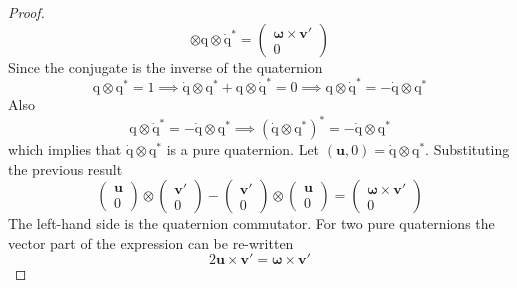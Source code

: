 \documentclass{amsart}
\theoremstyle{definition}
\theoremstyle{remark}
\numberwithin{equation}{section}
\begin{document}
\begin{proof}
\begin{equation}
    \otimes \mathrm{q} \otimes \mathrm{\dot{q}^*} =
    \begin{pmatrix}
      \boldsymbol\omega\times\mathbf{v}' \\
      0
    \end{pmatrix}
  \end{equation}
  Since the conjugate is the inverse of the quaternion
  \begin{equation}
    \mathrm{q}\otimes\mathrm{q^*} = 1 \implies
    \mathrm{\dot{q}} \otimes\mathrm{q^*}+\mathrm{q}\otimes\mathrm{\dot{q}^*} = 0 \implies
    \mathrm{q}\otimes\mathrm{\dot{q}^*} = -\mathrm{\dot{q}}\otimes\mathrm{q^*}
  \end{equation}
  Also
  \begin{equation}
    \mathrm{q}\otimes\mathrm{\dot{q}^*} = -\mathrm{\dot{q}}\otimes\mathrm{q^*} \implies
    \left(\mathrm{\dot{q}}\otimes\mathrm{q}^*\right)^*=-\mathrm{\dot{q}}\otimes \mathrm{q^*}
  \end{equation}
  which implies that $\mathrm{\dot{q}}\otimes\mathrm{q}^*$ is a pure quaternion. Let $(\mathbf{u}, 0) = \mathrm{\dot{q}}\otimes\mathrm{q}^*$.
  Substituting the previous result
  \begin{equation}
    \begin{pmatrix}
      \mathbf{u} \\
      0
    \end{pmatrix}
    \otimes
    \begin{pmatrix}
      \mathbf{v}'\\
      0
    \end{pmatrix}
    -
    \begin{pmatrix}
      \mathbf{v}'\\
      0
    \end{pmatrix}
    \otimes
    \begin{pmatrix}
      \mathbf{u}\\
      0
    \end{pmatrix}
    =
    \begin{pmatrix}
      \boldsymbol\omega\times\mathbf{v}'\\
      0
    \end{pmatrix}
  \end{equation}
  The left-hand side is the quaternion commutator. For two pure quaternions the vector part of the expression can be re-written
  \begin{equation}
    2\mathbf{u}\times\mathbf{v}' = \boldsymbol\omega\times\mathbf{v}'
  \end{equation}

\end{proof}
\end{document}
